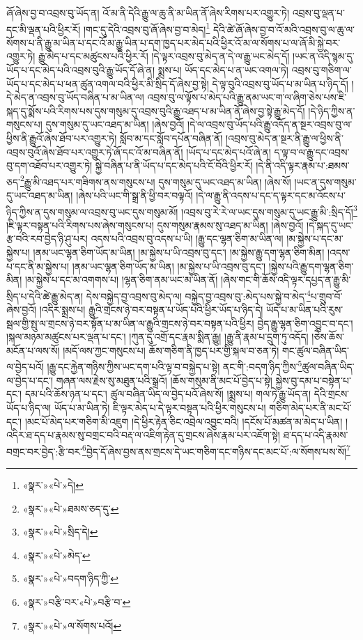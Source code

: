 ཞོ་ཞེས་བྱ་བ་འབྲས་བུ་ཡོད་ན། འོ་མ་ནི་དེའི་རྒྱུ་ལ་ཆུ་ནི་མ་ཡིན་ནོ་ཞེས་རིགས་པར་འགྱུར་ཏེ། འབྲས་བུ་ལྡན་པ་དང་མི་ལྡན་པའི་ཕྱིར་རོ། །གང་དུ་དེའི་འབྲས་བུ་ཞོ་ཞེས་བྱ་བ་མེད།\footnote{«སྣར་»«པེ་»དེ།} དེའི་ཚེ་ཞོ་ཞེས་བྱ་བ་འོ་མའི་འབྲས་བུ་ལ་ཆུ་ལ་སོགས་པ་ནི་རྒྱུ་མ་ཡིན་པ་དང་འོ་མ་རྒྱུ་ཡིན་པ་དག་ཁྱད་པར་མེད་པའི་ཕྱིར་འོ་མ་ལ་སོགས་པ་ལ་ཞོ་མི་སྐྱེ་བར་འགྱུར་ཏེ། རྒྱུ་མེད་པ་དང་མཚུངས་པའི་ཕྱིར་རོ། །དེ་ལྟར་འབྲས་བུ་མེད་ན་དེ་ལ་རྒྱུ་ཡང་མེད་དོ། །ཡང་ན་འདི་སྙམ་དུ་ཡོད་པ་དང་མེད་པའི་འབྲས་བུའི་རྒྱུ་ཡོད་དོ་ཞེ་ན། སྨྲས་པ། ཡོད་དང་མེད་པ་ན་ཡང་འགལ་ཏེ། འབྲས་བུ་གཅིག་ལ་ཡོད་པ་དང་མེད་པ་ཕན་ཚུན་འགལ་བའི་ཕྱིར་མི་སྲིད་དོ་ཞེས་བྱ་སྟེ། དེ་ལྟ་བུའི་འབྲས་བུ་ཡོད་པ་མ་ཡིན་པ་ཉིད་དོ། །དེ་མེད་ན་འབྲས་བུ་ཡོད་བཞིན་པ་མ་ཡིན་ལ། འབྲས་བུ་ལ་ལྟོས་པ་མེད་པའི་རྒྱུ་ནམ་ཡང་ག་ལ་ཞིག་ཅེས་པས་ཇི་སྐད་དུ་སྨོས་པའི་རིགས་པས་དུས་གསུམ་དུ་འབྲས་བུའི་རྒྱུ་འཐད་པ་མ་ཡིན་ནོ་ཞེས་བྱ་སྟེ་རྒྱུ་མེད་དོ། །དེ་ཉིད་ཀྱིས་ན་གསུངས་པ། དུས་གསུམ་དུ་ཡང་འཐད་མ་ཡིན། །ཞེས་བྱའོ། །དེ་ལ་འབྲས་བུ་ཡོད་པའི་རྒྱུ་འདོད་ན་སྔར་འབྲས་བུ་ལ་ཕྱིས་ནི་རྒྱུའོ་ཞེས་ཐོབ་པར་འགྱུར་ཏེ། སློབ་མ་དང་སློབ་དཔོན་བཞིན་ནོ། །འབྲས་བུ་མེད་ན་སྔར་ནི་རྒྱུ་ལ་ཕྱིས་ནི་འབྲས་བུའོ་ཞེས་ཐོབ་པར་འགྱུར་ཏེ་ཞོ་དང་འོ་མ་བཞིན་ནོ། །ཡོད་པ་དང་མེད་པའོ་ཞེ་ན། ད་ལྟ་བ་ལ་རྒྱུ་དང་འབྲས་བུ་དག་འཐོབ་པར་འགྱུར་ཏེ། སྐྱེ་བཞིན་པ་ནི་ཡོད་པ་དང་མེད་པའི་ངོ་བོའི་ཕྱིར་རོ། །དེ་ནི་འདི་ལྟར་རྣམ་པ་:ཐམས་ཅད་\footnote{«སྣར་»«པེ་»ཐམས་ཅད་དུ་}རྒྱུ་མི་འཐད་པར་གཟིགས་ནས་གསུངས་པ། དུས་གསུམ་དུ་ཡང་འཐད་མ་ཡིན། །ཞེས་སོ། །ཡང་ན་དུས་གསུམ་དུ་ཡང་འཐད་མ་ཡིན། །ཞེས་པའི་ཡང་གི་སྒྲ་ནི་ཕྱི་བར་བལྟའོ། །དེ་ལ་རྒྱུ་ནི་འདས་པ་དང་ད་ལྟར་དང་མ་འོངས་པ་ཉིད་ཀྱིས་ན་དུས་གསུམ་ལ་འབྲས་བུ་ཡང་དུས་གསུམ་མོ། །འབྲས་བུ་རེ་རེ་ལ་ཡང་དུས་གསུམ་དུ་ཡང་རྒྱུ་མི་:སྲིད་དོ།\footnote{«སྣར་»«པེ་»སྲིད་དེ།} །ཇི་ལྟར་བསྟན་པའི་རིགས་པས་ཞེས་གསུངས་པ། དུས་གསུམ་རྣམས་སུ་འཐད་མ་ཡིན། །ཞེས་བྱའོ། །དེ་སྐད་དུ་ཡང་རྩ་བའི་རབ་བྱེད་ཉི་ཤུ་པར། འདས་པའི་འབྲས་བུ་འདས་པ་ཡི། །རྒྱུ་དང་ལྷན་ཅིག་མ་ཡིན་ལ། །མ་སྐྱེས་པ་དང་མ་སྐྱེས་པ། །ནམ་ཡང་ལྷན་ཅིག་ཡོད་མ་ཡིན། །མ་སྐྱེས་པ་ཡི་འབྲས་བུ་དང་། །མ་སྐྱེས་རྒྱུ་དག་ལྷན་ཅིག་མིན། །འདས་པ་དང་ནི་མ་སྐྱེས་པ། །ནམ་ཡང་ལྷན་ཅིག་ཡོད་མ་ཡིན། །མ་སྐྱེས་པ་ཡི་འབྲས་བུ་དང་། །སྐྱེས་པའི་རྒྱུ་དག་ལྷན་ཅིག་མིན། །མ་སྐྱེས་པ་དང་མ་འགགས་པ། །ལྷན་ཅིག་ནམ་ཡང་མ་ཡིན་ནོ། །ཞེས་གང་གི་ཆོས་འདི་ལྟར་དཔྱད་ན་རྒྱུ་མི་སྲིད་པ་དེའི་ཚེ་རྒྱུ་མེད་ན། དེས་བསྐྱེད་བྱ་འབྲས་བུ་མེད་ལ། བསྐྱེད་བྱ་འབྲས་བུ་:མེད་པས་སྐྱེ་བ་མེད་\footnote{«སྣར་»«པེ་»མེད་}པ་གྲུབ་བོ་ཞེས་བྱའོ། །འདིར་སྨྲས་པ། རྒྱུའི་གྲངས་ཉེ་བར་བསྟན་པ་ཡོད་པའི་ཕྱིར་ཡོད་པ་ཉིད་དེ། ཡོད་པ་མ་ཡིན་པའི་རུས་སྦལ་གྱི་སྤུ་ལ་གྲངས་ཉེ་བར་སྟོན་པ་མ་ཡིན་ལ་རྒྱུའི་གྲངས་ཉེ་བར་བསྟན་པའི་ཕྱིར། བྱེད་རྒྱུ་ལྷན་ཅིག་འབྱུང་བ་དང་། །སྐལ་མཉམ་མཚུངས་པར་ལྡན་པ་དང་། །ཀུན་དུ་འགྲོ་དང་རྣམ་སྨིན་རྒྱུ། །རྒྱུ་ནི་རྣམ་པ་དྲུག་ཏུ་འདོད། །ཅེས་ཆོས་མངོན་པ་ལས་སོ། །མདོ་ལས་ཀྱང་གསུངས་པ། ཆོས་གཅིག་ནི་ཁྱད་པར་གྱི་སྐལ་བ་ཅན་ཏེ། གང་ཚུལ་བཞིན་ཡིད་ལ་བྱེད་པའོ། །རྒྱུ་དང་རྐྱེན་གཉིས་ཀྱིས་ཡང་དག་པའི་ལྟ་བ་བསྐྱེད་པ་སྟེ། ནང་གི་:བདག་ཉིད་ཀྱིས་\footnote{«སྣར་»«པེ་»བདག་ཉིད་ཀྱི་}ཚུལ་བཞིན་ཡིད་ལ་བྱེད་པ་དང་། གཞན་ལས་རྗེས་སུ་མཐུན་པའི་སྒྲའོ། །ཆོས་གསུམ་ནི་མང་པོ་བྱེད་པ་སྟེ། སྐྱེས་བུ་དམ་པ་བསྟེན་པ་དང་། དམ་པའི་ཆོས་ཉན་པ་དང་། ཚུལ་བཞིན་ཡིད་ལ་བྱེད་པའོ་ཞེས་སོ། །སྨྲས་པ། གལ་ཏེ་རྒྱུ་ཡོད་ན། དེའི་གྲངས་ཡོད་པ་ཉིད་ལ། ཡོད་པ་མ་ཡིན་ཏེ། ཇི་ལྟར་མེད་པ་དེ་ལྟར་བསྟན་པའི་ཕྱིར་གསུངས་པ། གཅིག་མེད་པར་ནི་མང་པོ་དང་། །མང་པོ་མེད་པར་གཅིག་མི་འཇུག །དེ་ཕྱིར་རྟེན་ཅིང་འབྲེལ་འབྱུང་བའི། །དངོས་པོ་མཚན་མ་མེད་པ་ཡིན། །འདིར་ཐ་དད་པ་རྣམས་སུ་བགྲང་བའི་བརྡ་ལ་འཇིག་རྟེན་དུ་གྲངས་ཞེས་རྣམ་པར་འཇོག་སྟེ། ཐ་དད་པ་འདི་རྣམས་བགྲང་བར་བྱེད་:རྩི་བར་\footnote{«སྣར་»བརྩི་བར་«པེ་»བརྩི་བ་}བྱེད་དོ་ཞེས་བྱས་ནས་གྲངས་དེ་ཡང་གཅིག་དང་གཉིས་དང་མང་པོ་:ལ་སོགས་པས་སོ།\footnote{«སྣར་»«པེ་»ལ་སོགས་པའོ།} 